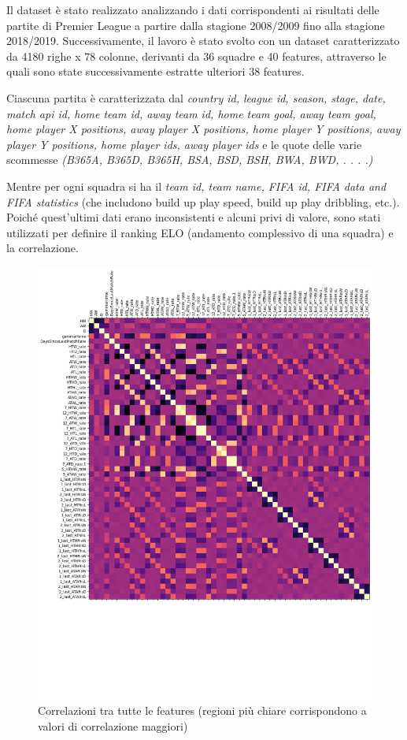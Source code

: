 Il dataset è stato realizzato analizzando i dati corrispondenti ai risultati delle partite di Premier League a partire
dalla stagione 2008/2009 fino alla stagione 2018/2019.
Successivamente, il lavoro è stato svolto con un dataset caratterizzato da 4180 righe x 78 colonne, 
derivanti da 36 squadre e 40 features, attraverso le quali sono state successivamente estratte ulteriori 38 features.

Ciascuna partita è caratterizzata dal \textit{country id, league id, season, stage, date, match api id,
home team id, away team id, home team goal, away team goal, home player X positions,
away player X positions, home player Y positions, away player Y positions, home player ids,
away player ids} e le quote delle varie scommesse \textit{(B365A, B365D, B365H, BSA, BSD, BSH, BWA, BWD, . . . .)}

Mentre per ogni squadra si ha il \textit{team id, team name, FIFA id, FIFA data 
and FIFA statistics} (che includono build up play speed, build up play dribbling, etc.).
Poiché quest'ultimi dati erano inconsistenti e alcuni privi di valore, 
sono stati utilizzati per definire il ranking ELO (andamento complessivo di una squadra) e la correlazione. 

\begin{figure}[h]
        \centering
        \includegraphics[scale=0.5]{tesina/img/corr_feat.pdf}
        \caption{Correlazioni tra tutte le features (regioni più chiare corrispondono a valori di correlazione maggiori)}
\end{figure}

